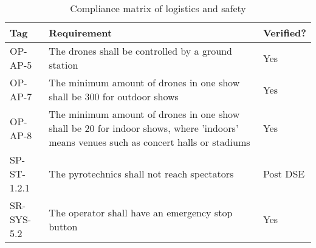 \begin{table}[h]
\centering
\caption{Compliance matrix of logistics and safety}
\label{tab:compliancelog}

\begin{tabular}{|p{2cm}|p{10cm}|p{1.8cm}|}
\hline
Tag & Requirement & Verified? \\ \hline
OP-AP-5 & The drones shall be controlled by a ground station & \cellcolor[HTML]{C1FFC1}Yes \\ \hline
OP-AP-7 & The minimum amount of drones in one show shall be 300 for outdoor shows & \cellcolor[HTML]{C1FFC1}Yes \\ \hline
OP-AP-8 & The minimum amount of drones in one show shall be 20 for indoor  shows, where ’indoors’ means venues such as concert halls or stadiums & \cellcolor[HTML]{C1FFC1}Yes \\ \hline
SP-ST-1.2.1 & The pyrotechnics shall not reach spectators & \cellcolor[HTML]{DDEBF7}Post DSE \\ \hline
SR-SYS-5.2 & The operator shall have an emergency stop button & \cellcolor[HTML]{C1FFC1}Yes \\ \hline
\end{tabular}%

\end{table}

